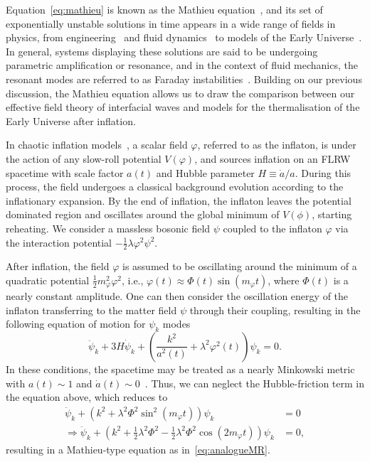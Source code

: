 \documentclass[a4paper]{jpconf}
\begin{document}
Equation~\eqref{eq:mathieu} is known as the Mathieu equation~\cite{Kovacic2018MathieusFeatures,Magnus2013HillsEquation}, and its set of exponentially unstable solutions in time appears in a wide range of fields in physics, from engineering~\cite{Gazzola2015BriefBridges,Biran2014ChapterWaves} and fluid dynamics~\cite{Faraday1831XVII.Surfaces,Kumar94} to models of the Early Universe~\cite{Kofman94,Shtanov:1994ce}. In general, systems displaying these solutions are said to be undergoing parametric amplification or resonance, and in the context of fluid mechanics, the resonant modes are referred to as Faraday instabilities~\cite{Faraday1831XVII.Surfaces}. Building on our previous discussion, the Mathieu equation allows us to draw the comparison between our effective field theory of interfacial waves and models for the thermalisation of the Early Universe after inflation. 

In chaotic inflation models~\cite{Mukhanov2005PhysicalCosmology}, a scalar field $\varphi$, referred to as the inflaton, is under the action of any slow-roll potential $V(\varphi)$, and sources inflation on an FLRW spacetime with scale factor $a(t)$ and Hubble parameter $H\equiv \dot{a}/a$. During this process, the field undergoes a classical background evolution according to the inflationary expansion. By the end of inflation, the inflaton leaves the potential dominated region and oscillates around the global minimum of $V(\phi)$, starting reheating. We consider a massless bosonic field $\psi$ coupled to the inflaton $\varphi$ via the interaction potential $-\tfrac{1}{2}\lambda\varphi^2\psi^2$. 

After inflation, the field $\varphi$ is assumed to be oscillating around the minimum of a quadratic potential $\tfrac{1}{2}m_{\varphi}^2\varphi^2$, i.e., $\varphi(t)\approx \Phi(t) \sin(m_{\varphi}t)$, where $\Phi(t)$ is a nearly constant amplitude. One can then consider the oscillation energy of the inflaton transferring to the matter field $\psi$ through their coupling, resulting in the following equation of motion for $\psi_k$ modes~\cite{Kofman94,Baumann2015TheInflation}
\begin{equation}
    \ddot{\psi}_k+3H\dot{\psi}_k +\left(\frac{k^2}{a^2(t)}+\lambda^2\varphi^2(t)\right)\psi_k=0.\label{eq:reheatEOM1}
\end{equation}
In these conditions, the spacetime may be treated as a nearly Minkowski metric with $a(t)\sim 1$ and $ \dot{a}(t)\sim 0$~\cite{Mukhanov2005PhysicalCosmology}. Thus, we can neglect the Hubble-friction term in the equation above, which reduces to 
\begin{subequations}
    \begin{align}
        \ddot{\psi}_k+\left(k^2+\lambda^2\Phi^2\sin^2(m_{\varphi}t)\right)\psi_k&=0\label{eq:reheatDyn}\\
        \Rightarrow \ddot{\psi}_k+\left(k^2+\frac{1}{2}\lambda^2\Phi^2-\frac{1}{2}\lambda^2\Phi^2\cos(2m_{\varphi}t)\right)\psi_k&=0,\label{eq:reheatMathieu}
    \end{align}
\end{subequations}
resulting in a Mathieu-type equation as in~\eqref{eq:analogueMR}.
\end{document}
